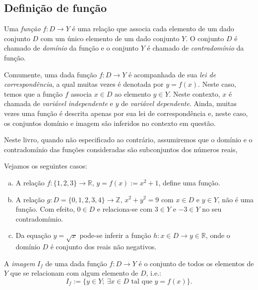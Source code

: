 \subsection{Definição de função}

\begin{defn}
  Uma \emph{função} $f:D \to Y$ é uma relação que associa cada elemento de um dado conjunto $D$ com um único elemento de um dado conjunto $Y$. O conjunto $D$ é chamado de \emph{domínio} da função e o conjunto $Y$ é chamado de \emph{contradomínio} da função.
\end{defn}

Comumente, uma dada função $f:D\to Y$ é acompanhada de sua \emph{lei de correspondência}, a qual muitas vezes é denotada por $y = f(x)$. Neste caso, temos que a função $f$ associa $x\in D$ ao elemento $y\in Y$. Neste contexto, $x$ é chamada de \emph{variável independente} e $y$ de \emph{variável dependente}. Ainda, muitas vezes uma função é descrita apenas por sua lei de correspondência e, neste caso, os conjuntos domínio e imagem são inferidos no contexto em questão.

\begin{obs}
  Neste livro, quando não especificado ao contrário, assumiremos que o domínio e o contradomínio das funções consideradas são subconjuntos dos números reais,
\end{obs}

\begin{ex} Vejamos os seguintes casos:
  \begin{enumerate}[a)]
  \item A relação $f:\{1,2,3\}\to\mathbb{R}$, $y = f(x) := x^2 + 1$, define uma função.
  \item A relação $g:D=\{0,1,2,3,4\}\to\mathbb{Z}$, $x^2 + y^2 = 9$ com $x\in D$ e $y\in Y$, não é uma função. Com efeito, $0\in D$ e relaciona-se com $3\in Y$ e $-3\in Y$ no seu contradomímio.
  \item Da equação $y = \sqrt{x}$ pode-se inferir a função $h:x\in D \to y\in\mathbb{R}$, onde o domínio $D$ é conjunto dos reais não negativos.
  \end{enumerate}
\end{ex}

\begin{defn}
  A \emph{imagem} $I_f$ de uma dada função $f:D\to Y$ é o conjunto de todos os elementos de $Y$ que se relacionam com algum elemento de $D$, i.e.:
  \begin{equation}
    I_f := \{y\in Y;~\exists x\in D\text{ tal que }y=f(x)\}.
  \end{equation}
\end{defn}

